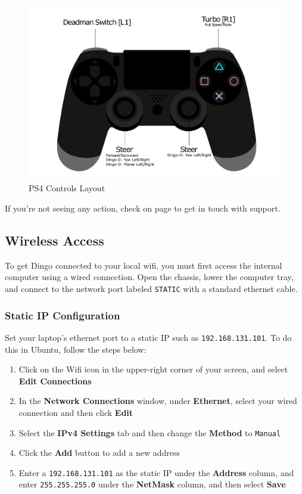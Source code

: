 \documentclass[]{clearpath-latex/clearpath-manual}
\begin{document}
\begin{figure}[H]
  \centering
  \includegraphics[width=0.75\linewidth]{dingo-sony-ps4-controller-labelled.pdf}
  \caption{PS4 Controls Layout}
  \label{ps4layout}
\end{figure}


If you're not seeing any action, check  on page \pageref{trouble} to
get in touch with support.

\subsection{Wireless Access}

To get Dingo connected to your local wifi, you must first access the internal computer
using a wired connection. Open the chassis, lower the computer tray, and connect to the network port
labeled \lstinline{STATIC} with a standard ethernet cable.

\subsubsection{Static IP Configuration}

Set your laptop's ethernet port to a static IP such as \lstinline{192.168.131.101}.  To do this in Ubuntu, follow the steps below:
\begin{enumerate}
  \item Click on the Wifi icon in the upper-right corner of your screen, and select \textbf{Edit Connections}
  \item In the \textbf{Network Connections} window, under \textbf{Ethernet}, select your wired connection and then click \textbf{Edit}
  \item Select the \textbf{IPv4 Settings} tab and then change the \textbf{Method} to \lstinline{Manual}
  \item Click the \textbf{Add} button to add a new address
  \item Enter a \lstinline{192.168.131.101} as the static IP under the \textbf{Address} column, and enter \lstinline{255.255.255.0} under the \textbf{NetMask} column, and then select \textbf{Save}
\end{enumerate}
\end{document}
